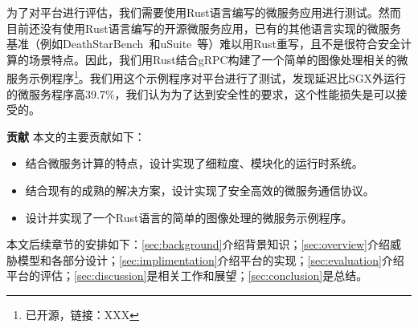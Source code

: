 为了对平台进行评估，我们需要使用Rust语言编写的微服务应用进行测试。然而目前还没有使用Rust语言编写的开源微服务应用，已有的其他语言实现的微服务基准（例如DeathStarBench~\cite{}和uSuite~\cite{}等）难以用Rust重写，且不是很符合安全计算的场景特点。因此，我们用Rust结合gRPC构建了一个简单的图像处理相关的微服务示例程序\footnote{已开源，链接：XXX}。我们用这个示例程序对平台进行了测试，发现延迟比SGX外运行的微服务程序高39.7\%，我们认为为了达到安全性的要求，这个性能损失是可以接受的。

\textbf{贡献} 本文的主要贡献如下：
\begin{itemize}
    \item 结合微服务计算的特点，设计实现了细粒度、模块化的运行时系统。
    \item 结合现有的成熟的解决方案，设计实现了安全高效的微服务通信协议。
    \item 设计并实现了一个Rust语言的简单的图像处理的微服务示例程序。
\end{itemize}

本文后续章节的安排如下：\cref{sec:background}介绍背景知识；\cref{sec:overview}介绍威胁模型和各部分设计；\cref{sec:implimentation}介绍平台的实现；\cref{sec:evaluation}介绍平台的评估；\cref{sec:discussion}是相关工作和展望；\cref{sec:conclusion}是总结。




